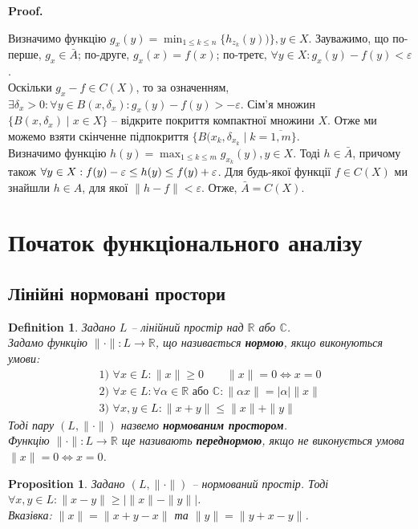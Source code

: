 \documentclass[a4paper, 10pt]{article}
\makeatletter
\theoremstyle{theoremdd}
\theoremstyle{theoremdd}
\newtheorem{definition}[theorem]{Definition}
\theoremstyle{theoremdd}
\theoremstyle{theoremdd}
\theoremstyle{theoremdd}
\newtheorem{proposition}[theorem]{Proposition}
\theoremstyle{theoremdd}
\theoremstyle{theoremdd}
\theoremstyle{theoremdd}
\renewenvironment{proof}[1][Proof.\\]{\par
\pushQED{\hfill \qed}%
\normalfont \topsep6\p@\@plus6\p@\relax
\trivlist
\item\relax
{\bfseries
#1\@addpunct{.}}\hspace\labelsep\ignorespaces
}{%
\popQED\endtrivlist\@endpefalse
}
\makeatother
\begin{document}
\begin{proof}
Визначимо функцію $g_x(y) = \displaystyle\min_{1 \leq k \leq n} \{h_{z_k}(y))\}, y \in X$. Зауважимо, що по-перше, $g_x \in \bar{A}$; по-друге, $g_x(x) = f(x)$; по-третє, $\forall y \in X: g_x(y) -f(y) < \varepsilon$.\\
Оскільки $g_x - f \in C(X)$, то за означенням, $\exists \delta_x > 0: \forall y \in B(x,\delta_x): g_x(y) - f(y) > - \varepsilon$. Сім'я множин $\{B(x,\delta_x) \mid x \in X \}$ -- відкрите покриття компактної множини $X$. Отже ми можемо взяти скінченне підпокриття $\{B(x_k,\delta_{x_k} \mid k = \overline{1,m}\}$.\\
Визначимо функцію $h(y) = \displaystyle\max_{1 \leq k \leq m} g_{x_k}(y), y \in X$. Тоді $h \in \bar{A}$, причому також $\forall y \in X: \\ f(y) - \varepsilon \leq h(y) \leq f(y) + \varepsilon$. Для будь-якої функції $f \in C(X)$ ми знайшли $h \in A$, для якої $\|h - f\| < \varepsilon$. Отже, $\bar{A} = C(X)$.
\end{proof}
\newpage

\section{Початок функціонального аналізу}
\subsection{Лінійні нормовані простори}
\begin{definition}
Задано $L$ -- лінійний простір над $\mathbb{R}$ або $\mathbb{C}$.\\
Задамо функцію $\| \cdot \| \colon L \to \mathbb{R}$, що називається \textbf{нормою}, якщо виконуються умови:
\begin{align*}
\text{1) } \forall x \in L: \|x\| \geq 0 \qquad \|x\| = 0 \iff x = 0 \\
\text{2) } \forall x \in L: \forall \alpha \in \mathbb{R} \text{ або } \mathbb{C}: \|\alpha x\| = |\alpha| \|x\| \\
\text{3) } \forall x,y \in L: \|x+y\| \leq \|x\| + \|y\|
\end{align*}
Тоді пару $(L, \|\cdot \|)$ назвемо \textbf{нормованим простором}.\\
Функцію $\| \cdot \| \colon L \to \mathbb{R}$ ще називають \textbf{переднормою}, якщо не виконується умова $\|x\| = 0 \iff x = 0$.
\end{definition}

\begin{proposition}
Задано $(L, \| \cdot \|)$ -- нормований простір. Тоді $\forall x,y \in L: \|x-y\| \geq \left| \|x\| - \|y\| \right|$.\\
\textit{Вказівка: $\|x\| = \|x + y - x\|$ та $\|y\| = \|y + x -y \|$.}
\end{proposition}
\end{document}
